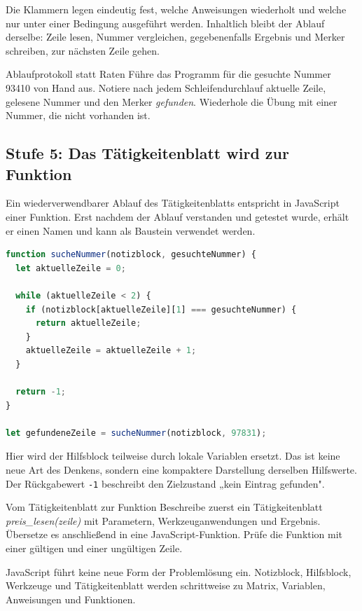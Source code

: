 \documentclass{article}
\begin{document}
Die Klammern legen eindeutig fest, welche Anweisungen wiederholt und welche nur unter einer Bedingung ausgeführt werden. Inhaltlich bleibt der Ablauf derselbe: Zeile lesen, Nummer vergleichen, gegebenenfalls Ergebnis und Merker schreiben, zur nächsten Zeile gehen.

\begin{uebung}{Ablaufprotokoll statt Raten}
Führe das Programm für die gesuchte Nummer 93410 von Hand aus. Notiere nach jedem Schleifendurchlauf aktuelle Zeile, gelesene Nummer und den Merker \emph{gefunden}. Wiederhole die Übung mit einer Nummer, die nicht vorhanden ist.
\end{uebung}

\subsection{Stufe 5: Das Tätigkeitenblatt wird zur Funktion}

Ein wiederverwendbarer Ablauf des Tätigkeitenblatts entspricht in JavaScript einer Funktion. Erst nachdem der Ablauf verstanden und getestet wurde, erhält er einen Namen und kann als Baustein verwendet werden.

\begin{lstlisting}[language=JavaScript]
function sucheNummer(notizblock, gesuchteNummer) {
  let aktuelleZeile = 0;

  while (aktuelleZeile < 2) {
    if (notizblock[aktuelleZeile][1] === gesuchteNummer) {
      return aktuelleZeile;
    }
    aktuelleZeile = aktuelleZeile + 1;
  }

  return -1;
}

let gefundeneZeile = sucheNummer(notizblock, 97831);
\end{lstlisting}

Hier wird der Hilfsblock teilweise durch lokale Variablen ersetzt. Das ist keine neue Art des Denkens, sondern eine kompaktere Darstellung derselben Hilfswerte. Der Rückgabewert \texttt{-1} beschreibt den Zielzustand „kein Eintrag gefunden".

\begin{uebung}{Vom Tätigkeitenblatt zur Funktion}
Beschreibe zuerst ein Tätigkeitenblatt \emph{preis\_lesen(zeile)} mit Parametern, Werkzeuganwendungen und Ergebnis. Übersetze es anschließend in eine JavaScript-Funktion. Prüfe die Funktion mit einer gültigen und einer ungültigen Zeile.
\end{uebung}

\begin{merksatz}
JavaScript führt keine neue Form der Problemlösung ein. Notizblock, Hilfsblock, Werkzeuge und Tätigkeitenblatt werden schrittweise zu Matrix, Variablen, Anweisungen und Funktionen.
\end{merksatz}
\end{document}

